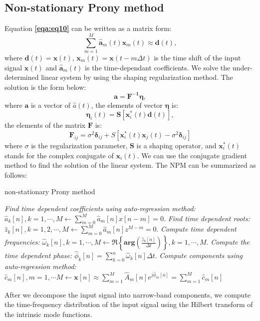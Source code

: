 \subsection{Non-stationary Prony method}
Equation \textbf{\ref{eqa:eq10}} can be written as a matrix form:
\begin{equation}
    \label{eqa:eq19}
    \sum_{m=1}^{M}\mathbf{\hat{a}}_m(t)\mathbf{x}_m(t) \approx \mathbf{d}(t),
\end{equation}
where $\mathbf{d}(t) = \mathbf{x}(t)$, $\mathbf{x}_m(t) = \mathbf{x}(t-m\Delta t)$ is the time shift
of the input signal $\mathbf{x}(t)$ and $\mathbf{\hat{a}}_m(t)$ is the time-dependant coefficients.
We solve the under-determined linear system by using the shaping regularization method.
The solution is the form below:
\begin{equation}
    \label{eqa:eq20}
    \mathbf{a = F^{-1}\eta},
\end{equation}
where $\mathbf{a}$ is a vector of $\hat{a}(t)$, the elements of vector $\mathbf{\eta}$ is:
\begin{equation}
    \label{eqa:eq21}
    \mathbf{\eta}_i(t) = \mathbf{S}\left[\mathbf{x}_i^*(t)\mathbf{d}(t)\right],
\end{equation}
the elements of the matrix $\mathbf{F}$ is:
\begin{equation}
    \label{eqa:eq22}
    \mathbf{F}_{ij}= \sigma^2 \mathbf{\delta}_{ij} + S[\mathbf{x}_i^*(t)\mathbf{x}_j(t) - \sigma^2 \mathbf{\delta}_{ij}]
\end{equation}
where $\sigma$ is the regularization parameter, $\mathbf{S}$ is a shaping operator,
and $\mathbf{x}_i^*(t)$ stands for the complex conjugate of $\mathbf{x}_i(t)$.
We can use the conjugate gradient method to find the solution of the linear system.
The NPM \cite[]{fomel2013} can be summarized as follows:
\begin{algorithm}
    \caption{non-stationary Prony method} 
    \label{pro:nopronyalgorithm}
  \begin{algorithmic}[1]
      \State \textit{Find time dependent coefficients using auto-regression method:} 
        $\displaystyle \hat{a}_k[n],k=1,\cdots,M \gets \sum_{m=0}^{M}\hat{a}_m[n]x[n-m] = 0.$
      \State \textit{Find time dependent roots:} 
         $\displaystyle \hat{z}_k[n],k=1,2,\cdots,M \gets \sum_{m=0}^{M}\hat{a}_m[n]z^{M-m}= 0.$
      \State \textit{Compute time dependent frequencies:}
         $\displaystyle \hat{\omega}_k[n], k=1,\cdots,M\gets\Re\left\{\mathbf{arg}\left(\frac{\hat{z}_k[n]}{\Delta t}\right)\right\}, k=1,\cdots,M.$
      \State \textit{Compute the time dependent phase:} 
       $\displaystyle \hat{\phi}_k[n] = \sum_{k=0}^{n}\hat{\omega}_k[n]\Delta t.$ 
      \State \textit{Compute components using auto-regression method:} 
        $\displaystyle \hat{c}_m[n], m=1,\cdots M \gets \mathbf{x}[n] \approx \sum_{m=1}^M \hat{A}_m[n]e^{j\hat{\phi}_m[n]}=\sum_{m=1}^M\hat{c}_m[n]$
  \end{algorithmic}
\end{algorithm}
After we decompose the input signal into narrow-band components, 
we compute the time-frequency distribution of the input signal 
using the Hilbert transform of the intrinsic mode functions.

\newpage
%
%

